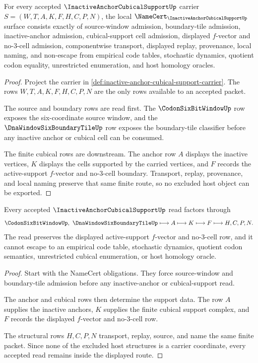 \begin{theorem}
\label{thm:inactive-anchor-cubical-support-namecert-obligations}
For every accepted $\InactiveAnchorCubicalSupportUp$ carrier $S=(W,T,A,K,F,H,C,P,N)$, the local $\NameCert_{\InactiveAnchorCubicalSupportUp}$ surface consists exactly of source-window admission, boundary-tile admission, inactive-anchor admission, cubical-support cell admission, displayed $f$-vector and no-$3$-cell admission, componentwise transport, displayed replay, provenance, local naming, and non-escape from empirical code tables, stochastic dynamics, quotient codon equality, unrestricted enumeration, and host homology oracles.
\end{theorem}
\begin{proof}
Project the carrier in \autoref{def:inactive-anchor-cubical-support-carrier}. The rows $W,T,A,K,F,H,C,P,N$ are the only rows available to an accepted packet.

The source and boundary rows are read first. The $\CodonSixBitWindowUp$ row exposes the six-coordinate source window, and the $\DnaWindowSixBoundaryTileUp$ row exposes the boundary-tile classifier before any inactive anchor or cubical cell can be consumed.

The finite cubical rows are downstream. The anchor row $A$ displays the inactive vertices, $K$ displays the cells supported by the carried vertices, and $F$ records the active-support $f$-vector and no-$3$-cell boundary. Transport, replay, provenance, and local naming preserve that same finite route, so no excluded host object can be exported.
\end{proof}

\begin{theorem}
\label{thm:inactive-anchor-cubical-support-nonescape}
Every accepted $\InactiveAnchorCubicalSupportUp$ read factors through
$$
\CodonSixBitWindowUp,\ \DnaWindowSixBoundaryTileUp \longmapsto A \longmapsto K \longmapsto F \longmapsto H,C,P,N .
$$
The read preserves the displayed active-support $f$-vector and no-$3$-cell row, and it cannot escape to an empirical code table, stochastic dynamics, quotient codon semantics, unrestricted cubical enumeration, or host homology oracle.
\end{theorem}
\begin{proof}
Start with the NameCert obligations. They force source-window and boundary-tile admission before any inactive-anchor or cubical-support read.

The anchor and cubical rows then determine the support data. The row $A$ supplies the inactive anchors, $K$ supplies the finite cubical support complex, and $F$ records the displayed $f$-vector and no-$3$-cell row.

The structural rows $H,C,P,N$ transport, replay, source, and name the same finite packet. Since none of the excluded host structures is a carrier coordinate, every accepted read remains inside the displayed route.
\end{proof}

